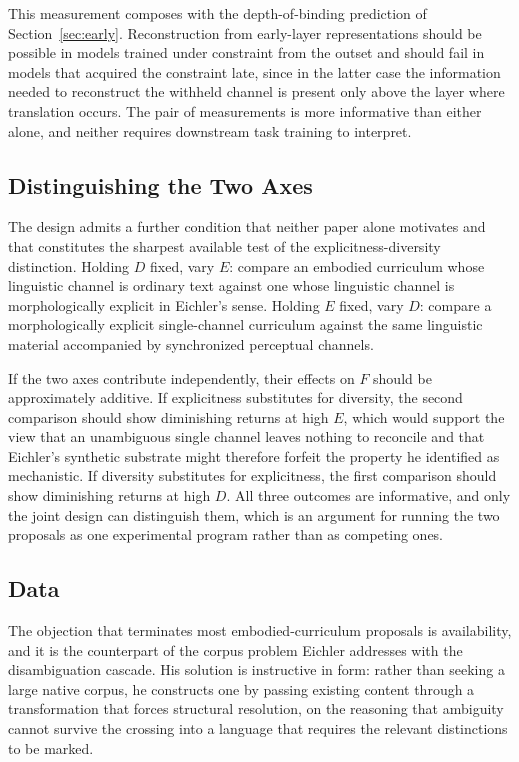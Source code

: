 \documentclass[11pt]{article}
\begin{document}
This measurement composes with the depth-of-binding prediction of Section~\ref{sec:early}. Reconstruction from early-layer representations should be possible in models trained under constraint from the outset and should fail in models that acquired the constraint late, since in the latter case the information needed to reconstruct the withheld channel is present only above the layer where translation occurs. The pair of measurements is more informative than either alone, and neither requires downstream task training to interpret.

\subsection{Distinguishing the Two Axes}

The design admits a further condition that neither paper alone motivates and that constitutes the sharpest available test of the explicitness-diversity distinction. Holding $D$ fixed, vary $E$: compare an embodied curriculum whose linguistic channel is ordinary text against one whose linguistic channel is morphologically explicit in Eichler's sense. Holding $E$ fixed, vary $D$: compare a morphologically explicit single-channel curriculum against the same linguistic material accompanied by synchronized perceptual channels.

If the two axes contribute independently, their effects on $F$ should be approximately additive. If explicitness substitutes for diversity, the second comparison should show diminishing returns at high $E$, which would support the view that an unambiguous single channel leaves nothing to reconcile and that Eichler's synthetic substrate might therefore forfeit the property he identified as mechanistic. If diversity substitutes for explicitness, the first comparison should show diminishing returns at high $D$. All three outcomes are informative, and only the joint design can distinguish them, which is an argument for running the two proposals as one experimental program rather than as competing ones.

\subsection{Data}

The objection that terminates most embodied-curriculum proposals is availability, and it is the counterpart of the corpus problem Eichler addresses with the disambiguation cascade. His solution is instructive in form: rather than seeking a large native corpus, he constructs one by passing existing content through a transformation that forces structural resolution, on the reasoning that ambiguity cannot survive the crossing into a language that requires the relevant distinctions to be marked.
\end{document}
